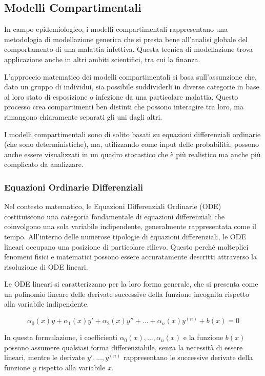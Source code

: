 \subsection{Modelli Compartimentali}

In campo epidemiologico, i modelli compartimentali \cite{ENDERLE2012359} rappresentano una 
metodologia di modellazione generica che si presta bene all'analisi 
globale del comportamento di una malattia infettiva. Questa tecnica di 
modellazione trova applicazione anche in altri ambiti scientifici, tra 
cui la finanza.

L'approccio matematico dei modelli compartimentali si basa sull'assunzione 
che, dato un gruppo di individui, sia possibile suddividerli in diverse 
categorie in base al loro stato di esposizione o infezione da una 
particolare malattia. Questo processo crea compartimenti ben distinti che 
possono interagire tra loro, ma rimangono chiaramente separati gli uni 
dagli altri.

I modelli compartimentali sono di solito basati su equazioni differenziali 
ordinarie (che sono deterministiche), ma, utilizzando come input delle probabilità, 
possono anche essere visualizzati in un quadro stocastico che è più realistico ma 
anche più complicato da analizzare.

\subsubsection*{Equazioni Ordinarie Differenziali}

Nel contesto matematico, le Equazioni Differenziali Ordinarie (ODE) 
costituiscono una categoria fondamentale di equazioni differenziali 
che coinvolgono una sola variabile indipendente, generalmente 
rappresentata come il tempo. All'interno delle numerose tipologie di 
equazioni differenziali, le ODE lineari occupano una posizione di 
particolare rilievo. Questo perché molteplici fenomeni fisici e 
matematici possono essere accuratamente descritti attraverso la 
risoluzione di ODE lineari.

Le ODE lineari si caratterizzano per la loro forma generale, 
che si presenta come un polinomio lineare delle derivate successive 
della funzione incognita rispetto alla variabile indipendente.

$$\alpha_0(x)y + \alpha_1(x)y' + \alpha_2(x)y'' + \ldots + \alpha_n(x)y^{(n)} + b(x) = 0$$

In questa formulazione, i coefficienti $\alpha_0(x), \ldots, \alpha_n(x)$ 
e la funzione $b(x)$ possono assumere qualsiasi forma differenziabile, 
senza la necessità di essere lineari, mentre le derivate 
$y', \ldots, y^{(n)}$ rappresentano le successive derivate della funzione 
$y$ rispetto alla variabile $x$.

